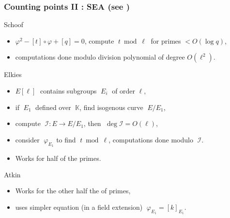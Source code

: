 \documentclass[10pt]{beamer}
\newcommand{\K}{\mathbb{K}}  %
\newcommand{\frob}{\varphi}  %
\newcommand{\0}{\mathcal{O}}  %
\newcommand{\isog}[1]{\mathcal{#1}}  %
\newcommand{\I}{\isog{I}}  %
\begin{document}

\begin{frame}
  \frametitle{Counting points II : SEA (see \cite{Scho95})}
  
  \begin{block}{Schoof}
    \begin{itemize}
    \item $\frob^2 - [t]\circ\frob + [q] = 0$, compute
      $\;t\bmod\ell\;$ for primes $<O(\log q)$,
    \item computations done modulo division polynomial of degree
      $O(\ell^2)$.
    \end{itemize}
  \end{block}

  \begin{block}{Elkies}
    \begin{itemize}
    \item $E[\ell]\;$ contains subgroups $\;E_i\;$ of order $\ell$,
    \item if $\;E_1\;$ defined over $\;\K$, find isogenous curve
      $\;E/E_1$,
    \item compute $\;\I:E\rightarrow E/E_1$, then $\;\deg\I = O(\ell)$,
    \item consider $\;\frob_{E_1}$ to find $\;t\bmod\ell$,
      computations done modulo $\;\I$.
    \item Works for half of the primes.
    \end{itemize}
  \end{block}

  \begin{block}{Atkin}
    \begin{itemize}
    \item Works for the other half the of primes,
    \item uses simpler equation (in a field extension)
      $\;\frob_{E_1}=[k]_{E_1}$.
    \end{itemize}
  \end{block}
\end{frame}

\end{document}

